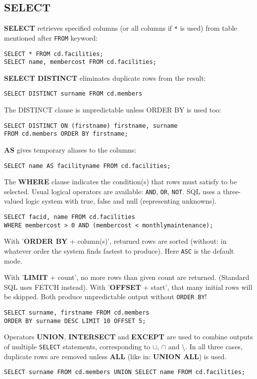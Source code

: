 %

\color{black}
\subsection{SELECT}
\textbf{SELECT} retrieves specified columns (or all columns if \texttt{*} is used) from table mentioned after \texttt{FROM} keyword:
\begin{verbatim}
SELECT * FROM cd.facilities;
SELECT name, membercost FROM cd.facilities;
\end{verbatim}

\textbf{SELECT DISTINCT} eliminates duplicate rows from the result:
\begin{verbatim}
SELECT DISTINCT surname FROM cd.members
\end{verbatim}

The DISTINCT clause is unpredictable unless ORDER BY is used too:
\begin{verbatim}
SELECT DISTINCT ON (firstname) firstname, surname
FROM cd.members ORDER BY firstname;
\end{verbatim}

\textbf{AS} gives temporary aliases to the columns:
\begin{verbatim}
SELECT name AS facilityname FROM cd.facilities;
\end{verbatim}

The \textbf{WHERE} clause indicates the condition(s) that rows must satisfy to be selected. 
Usual logical operators are available: \texttt{AND}, \texttt{OR}, \texttt{NOT}.
SQL uses a three-valued logic system with true, false and null (representing unknowns).
\begin{verbatim}
SELECT facid, name FROM cd.facilities
WHERE membercost > 0 AND (membercost < monthlymaintenance);
\end{verbatim}

With '\textbf{ORDER BY} + column(s)', returned rows are sorted (without: in whatever order the system finds fastest to produce).
Here \texttt{ASC} is the default mode.

With '\textbf{LIMIT} + count', no more rows than given count are returned.
{\color{gray}(Standard SQL uses FETCH instead).}
With '\textbf{OFFSET} + start', that many initial rows will be skipped.
Both produce unpredictable output without \texttt{ORDER BY}!

\begin{verbatim}
SELECT surname, firstname FROM cd.members
ORDER BY surname DESC LIMIT 10 OFFSET 5;
\end{verbatim}

Operators \textbf{UNION}, \textbf{INTERSECT} and \textbf{EXCEPT} are used to combine outputs of multiple \texttt{SELECT} statements, corresponding to $\cup$, $\cap$ and $\setminus$.
In all three cases, duplicate rows are removed unless \textbf{ALL} (like in: \textbf{UNION ALL}) is used.
\begin{verbatim}
SELECT surname FROM cd.members UNION SELECT name FROM cd.facilities;
\end{verbatim}

%